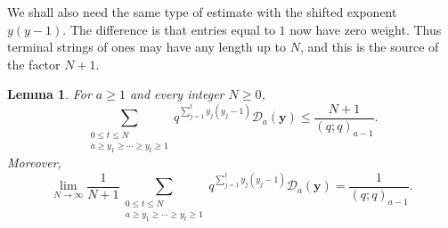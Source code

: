 \documentclass[a4paper,11pt,reqno]{amsart}
\theoremstyle{plain}
\newtheorem{lemma}[theorem]{Lemma}
\theoremstyle{remark}
\numberwithin{equation}{section}
\renewcommand{\leq}{\leqslant}
\renewcommand{\geq}{\geqslant}
\begin{document}
We shall also need the same type of estimate with the shifted exponent
$y(y-1)$. The difference is that entries equal to $1$ now have zero weight.
Thus terminal strings of ones may have any length up to $N$, and this is the
source of the factor $N+1$.

\begin{lemma}\label{lem:shifted-chain}
For $a\geq 1$ and every integer $N\geq 0$,
\[
\sum_{\substack{0\leq t\leq N\\ a\geq y_1\geq\cdots\geq y_t\geq 1}}
        q^{\sum_{j=1}^t y_j(y_j-1)}
        \mathcal D_a(\mathbf y)
        \leq
        \frac{N+1}{(q;q)_{a-1}}.
\]
Moreover,
\[
\lim_{N\to\infty}\frac{1}{N+1}
\sum_{\substack{0\leq t\leq N\\ a\geq y_1\geq\cdots\geq y_t\geq 1}}
        q^{\sum_{j=1}^t y_j(y_j-1)}
        \mathcal D_a(\mathbf y)
        =
        \frac{1}{(q;q)_{a-1}}.
\]
\end{lemma}
\end{document}

